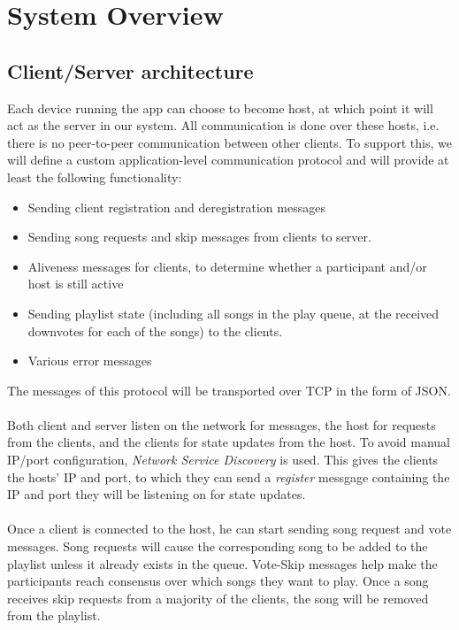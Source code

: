 \documentclass{report}
\begin{document}
\section{System Overview}
\subsection{Client/Server architecture}

Each device running the app can choose to become host, at which point it will
act as the server in our system. All communication is done over these hosts, 
i.e. there is no peer-to-peer communication between other clients.
To support this, we will define a custom application-level communication protocol 
and will provide at least the following functionality:
\begin{itemize}
\item Sending client registration and deregistration messages
\item Sending song requests and skip messages from clients to server.
\item Aliveness messages for clients, to determine whether a participant and/or host is still active
\item Sending playlist state (including all songs in the play queue, at the received downvotes for each of the songs) to the clients.
\item Various error messages
\end{itemize}
%
The messages of this protocol will be transported over TCP in the form of JSON.\\\\
%
Both client and server listen on the network for messages,
the host for requests from the clients, and the clients for state updates
from the host. To avoid manual IP/port configuration, \emph{Network Service Discovery}
\cite{nsd} is used. This gives the clients the hosts' IP and port,
to which they can send a \emph{register} messgage containing the IP and port they
will be listening on for state updates. \\\\
%
Once a client is connected to the host, he can start sending song request and vote messages.
Song requests will cause the corresponding song to be added to the playlist unless
it already exists in the queue. Vote-Skip messages help make the participants reach
consensus over which songs they want to play. Once a song receives skip requests
from a majority of the clients, the song will be removed from the playlist.\\\\ 
\end{document}

